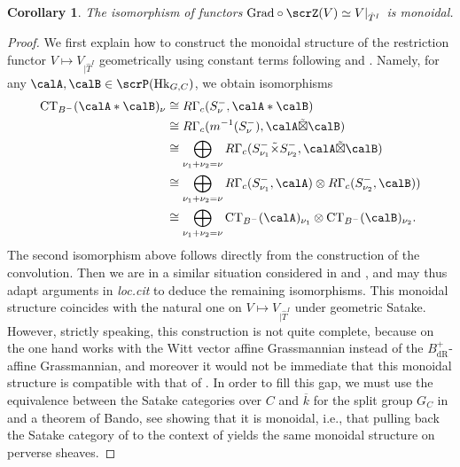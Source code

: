 \documentclass[10pt, reqno]{amsart}
\theoremstyle{plain}
\newtheorem{corollary}[theorem]{Corollary}
\theoremstyle{definition}
\numberwithin{equation}{section}
\begin{document}
	\begin{corollary}
		\label{sec:perversity-graded-monoidal}
		The isomorphism of functors
		$\mathrm{Grad}\circ \scrZ(V)\simeq V|_{\hat{T}^I}$ is monoidal.
	\end{corollary}
	\begin{proof}
		We first explain how to construct the monoidal structure of the restriction functor $V\mapsto V_{|\hat{T}^I}$ geometrically using constant terms following \cite[Section 6]{Yu22} and \cite[Section 4]{ALRR24}. Namely, for any $\calA,\calB\in \scrP(\mathrm{Hk}_{G,C})$, we obtain isomorphisms
		\begin{align*}
			\mathrm{CT}_{B^-}(\calA*\calB)_{\nu} & \cong R\Gamma_c(S^-_{\nu},\calA*\calB)\\   
			&\cong R\Gamma_c(m^{-1}(S^-_\nu),\calA\tilde{\boxtimes}\calB)\\
			& \cong \bigoplus_{\nu_1+\nu_2=\nu}R\Gamma_c(S^-_{\nu_1}\tilde{\times}S^-_{\nu_2},\calA\tilde{\boxtimes}\calB)\\
			& \cong \bigoplus_{\nu_1+\nu_2=\nu}R\Gamma_c(S^-_{\nu_1},\calA)\otimes R\Gamma_c(S^-_{\nu_2},\calB))\\
			& \cong \bigoplus_{\nu_1+\nu_2=\nu} \mathrm{CT}_{B^-}(\calA)_{\nu_1}\otimes \mathrm{CT}_{B^-}(\calB)_{\nu_2}.
		\end{align*}
		The second isomorphism above follows directly from the construction of the convolution. Then we are in a similar situation considered in \cite[Lemma~6.1]{Yu22} and \cite[Corollary~4.16]{ALRR24}, and may thus adapt arguments in \textit{loc.cit} to deduce the remaining isomorphisms. This monoidal structure coincides with the natural one on $V\mapsto V_{|\hat{T}^I}$ under geometric Satake. However, strictly speaking, this construction is not quite complete, because on the one hand \cite{Zhu17,Yu22} works with the Witt vector affine Grassmannian instead of the $B_{\mathrm{dR}}^+$-affine Grassmannian, and moreover it would not be immediate that this monoidal structure is compatible with that of \cite{FS21}. In order to fill this gap, we must use the equivalence  between the Satake categories over $C$ and $\overline{k}$ for the split group $G_C$ in \cite[VI.6.7]{FS21} and a theorem of Bando, see \cite[Theorem 1.1]{Ban22} showing that it is monoidal, i.e., that pulling back the Satake category of \cite{Zhu17,Yu22} to the context of \cite{FS21} yields the same monoidal structure on perverse sheaves.
		

\end{proof}
\end{document}
